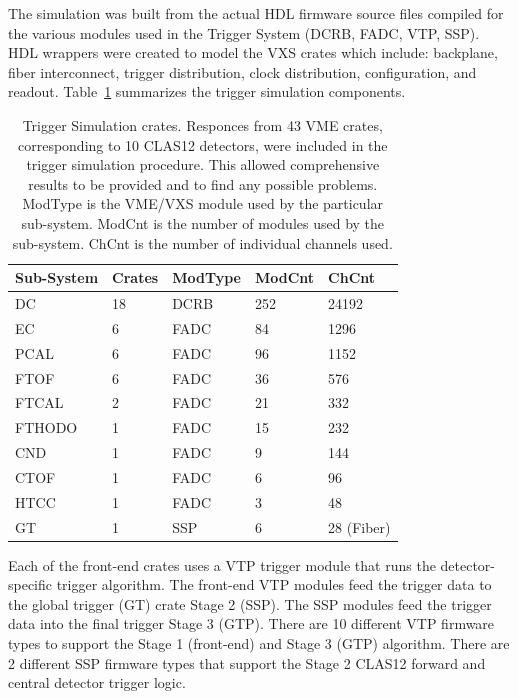 The simulation was built from the actual HDL firmware source files compiled for the various modules used in the Trigger System (DCRB, FADC, VTP, SSP). HDL wrappers were created to model the VXS crates which include: backplane, fiber interconnect, trigger distribution, clock distribution, configuration, and readout. Table~\ref{tab:trig_sim_crates} summarizes the trigger simulation components.

\begin{table}
\begin{adjustbox}{width=\columnwidth,center}
	\begin{tabular}{| l | l | l | l | l |}
		\hline \hline
		Sub-System		& Crates	& ModType	& ModCnt	& ChCnt		\\
		\hline
		DC			& 18		& DCRB		& 252		& 24192		\\
		EC		& 6			& FADC		& 84		& 1296	 	\\
		PCAL		& 6			& FADC		& 96		& 1152	 	\\
		FTOF		& 6			& FADC		& 36		& 576	 	\\
		FTCAL		& 2			& FADC		& 21		& 332	 	\\
		FTHODO		& 1			& FADC		& 15		& 232	 	\\
		CND			& 1			& FADC		& 9			& 144	 	\\
		CTOF		& 1			& FADC		& 6			& 96	 	\\
		HTCC		& 1			& FADC		& 3			& 48	 	\\
		GT			& 1			& SSP		& 6			& 28 (Fiber)	\\
		\hline \hline
	\end{tabular}
\end{adjustbox}
\caption{Trigger Simulation crates. Responces from 43 VME crates, corresponding to 10 CLAS12 detectors, were included in the trigger simulation procedure. This allowed comprehensive results to be provided and to find any possible problems. ModType is the VME/VXS module used by the particular sub-system. ModCnt is the number of modules used by the sub-system. ChCnt is the number of individual channels used.}
\label{tab:trig_sim_crates}
\end{table}

Each of the front-end crates uses a VTP trigger module that runs the detector-specific trigger algorithm. The front-end VTP modules feed the trigger data to the global trigger (GT) crate Stage 2 (SSP). The SSP modules feed the trigger data into the final trigger Stage 3 (GTP). There are 10 different VTP firmware types to support the Stage 1 (front-end) and Stage 3 (GTP) algorithm. There are 2 different SSP firmware types that support the Stage 2 CLAS12 forward and central detector trigger logic.

